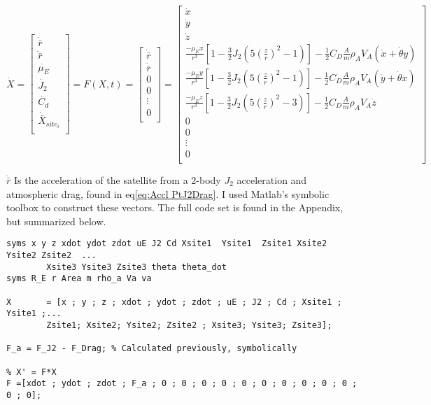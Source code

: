 \documentclass[12pt,a4paper,oneside]{article}
\numberwithin{equation}{section}   		%
\newcommand{\parens} [1] {\left(  #1  \right)}
\newcommand{\brackets} [1] {\left[ #1 \right]}
\newcommand{\arrayb}[2]{\brackets{ \begin{array}{#1}  #2 \end{array} } }
\begin{document}
\begin{equation}\label{State_Vector}
	\dot{X}=
	\arrayb{c}{ 
		\dot{\bar{r}}		\\
		\ddot{\bar{r}} 		\\
		\dot{\mu_E} 		\\
		\dot{J_2} 			\\
		\dot{C_d} 			\\
		\dot{\bar{X}}_{site_i} \\
		}
	= F(X,t)=
	\arrayb{c}{
		\dot{\bar{r}}	\\
		\ddot{\bar{r}}  	\\
		0 			\\
		0 			\\
		\vdots 		\\
		0			\\
		}	
	= 
	\arrayb{c}{
		\dot{x}		\\
		\dot{y}		\\
		\dot{z}		\\
		\frac{-\mu_E x}{r^3}\brackets{1 - \frac{3}{2}J_2 \parens{5\parens{\frac{z}{r}}^2 - 1}} - \frac{1}{2} C_D\frac{A}{m} \rho_A V_A\parens{\dot{x} + \dot{\theta}y}	\\
		\frac{-\mu_E y}{r^3}\brackets{1 - \frac{3}{2}J_2 \parens{5\parens{\frac{z}{r}}^2 - 1}} -\frac{1}{2}C_D\frac{A}{m} \rho_A V_A\parens{\dot{y} + \dot{\theta}x}	\\
		\frac{-\mu_E z}{r^3}\brackets{1 - \frac{3}{2}J_2 \parens{5\parens{\frac{z}{r}}^2 - 3}} -\frac{1}{2}C_D\frac{A}{m} \rho_A V_A\dot{z}			\\
		0		\\
		0		\\
		\vdots	\\
		0		\\
		}
\end{equation}


$\ddot{\bar{r}} $ Is the acceleration of the satellite from a 2-body $J_2$ acceleration and atmospheric drag, found in eq\eqref{eq:Accl PtJ2Drag}. I used Matlab's symbolic toolbox to construct these vectors. The full code set is found in the Appendix, but summarized below. 

\begin{lstlisting}
syms x y z xdot ydot zdot uE J2 Cd Xsite1  Ysite1  Zsite1 Xsite2 Ysite2 Zsite2  ...
		Xsite3 Ysite3 Zsite3 theta theta_dot
syms R_E r Area m rho_a Va va 

X       = [x ; y ; z ; xdot ; ydot ; zdot ; uE ; J2 ; Cd ; Xsite1 ; Ysite1 ;...
	    Zsite1; Xsite2; Ysite2; Zsite2 ; Xsite3; Ysite3; Zsite3];

F_a = F_J2 - F_Drag; % Calculated previously, symbolically

% X' = F*X
F =[xdot ; ydot ; zdot ; F_a ; 0 ; 0 ; 0 ; 0 ; 0 ; 0 ; 0 ; 0 ; 0 ; 0 ; 0 ; 0];

\end{lstlisting}
\end{document}
